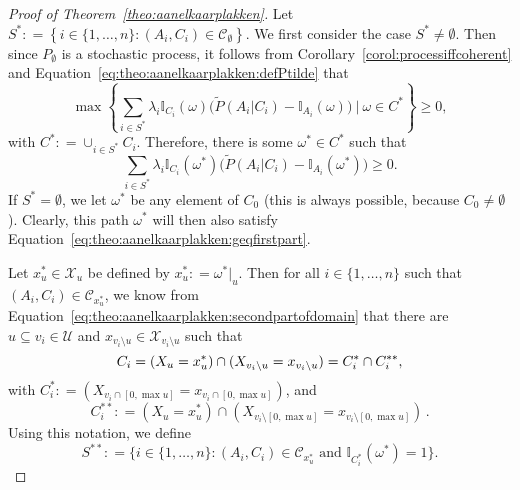 \documentclass[10pt,a4paper]{paper}
\theoremstyle{definition}
\newcommand{\states}{\mathcal{X}}
\newcommand{\ind}[1]{\mathbb{I}_{#1}}
\newcommand{\coloneqq}{:\!=}
\begin{document}
\begin{proof}[Proof of Theorem~\ref{theo:aanelkaarplakken}]
Let $S^*\coloneqq\left\{i\in\{1,\dots,n\}\colon(A_i,C_i)\in\mathcal{C}_\emptyset\right\}$. We first consider the case $S^*\neq\emptyset$. Then since $P_\emptyset$ is a stochastic process, it follows from Corollary~\ref{corol:processiffcoherent} and Equation~\eqref{eq:theo:aanelkaarplakken:defPtilde} that
\begin{equation*}%
\max\left\{\sum_{i\in S^*}\lambda_i\ind{C_i}(\omega)\bigl(\tilde{P}(A_i\vert C_i)-\ind{A_i}(\omega)\bigr)~\Bigg\vert~\omega\in C^*\right\}\geq0,
\end{equation*}
with $C^*\coloneqq\cup_{i\in S^*}C_i$. Therefore, there is some $\omega^*\in C^*$ such that
\begin{equation}\label{eq:theo:aanelkaarplakken:geqfirstpart}
\sum_{i\in S^*}\lambda_i\ind{C_i}(\omega^*)\bigl(\tilde{P}(A_i\vert C_i)-\ind{A_i}(\omega^*)\bigr)\geq0.
\end{equation}
If $S^*=\emptyset$, we let $\omega^*$ be any element of $C_0$ (this is always possible, because $C_0\neq\emptyset$). Clearly, this path $\omega^*$ will then also satisfy Equation~\eqref{eq:theo:aanelkaarplakken:geqfirstpart}.


Let $x_u^*\in\states_u$ be defined by $x_u^*\coloneqq \omega^*\vert_u$.
Then for all $i\in\{1,\dots,n\}$ such that $(A_i,C_i)\in\mathcal{C}_{x_u^*}$, we know from Equation~\eqref{eq:theo:aanelkaarplakken:secondpartofdomain} that there are $u\subseteq v_i\in\mathcal{U}$ and $x_{v_i\setminus u}\in\states_{v_i\setminus u}$ such that
\begin{equation}\label{eq:theo:aanelkaarplakken:Cisplit}
C_i=(X_u=x_u^*)\cap(X_{v_i\setminus u}=x_{v_i\setminus u})=C_i^*\cap C_i^{**},\vspace{2mm}
\end{equation}
with $C_i^{*}\coloneqq(X_{v_i\cap [0,\max u]}=x_{v_i\cap [0,\max u]})$, and
\begin{equation}\label{eq:theo:aanelkaarplakken:Cistarstar}
C_i^{**}\coloneqq(X_u=x_u^*)\cap(X_{v_i\setminus [0,\max u]}=x_{v_i\setminus [0,\max u]})\,.
\end{equation}
Using this notation, we define
\begin{equation}\label{eq:theo:aanelkaarplakken:Sstarstardef}
S^{**}\coloneqq
\{
i\in\{1,\dots,n\}
\colon
(A_i,C_i)\in\mathcal{C}_{x_u^*}
\text{~and~}
\ind{C_i^*}(\omega^*)=1
\}.
\end{equation}



\end{proof}
\end{document}

